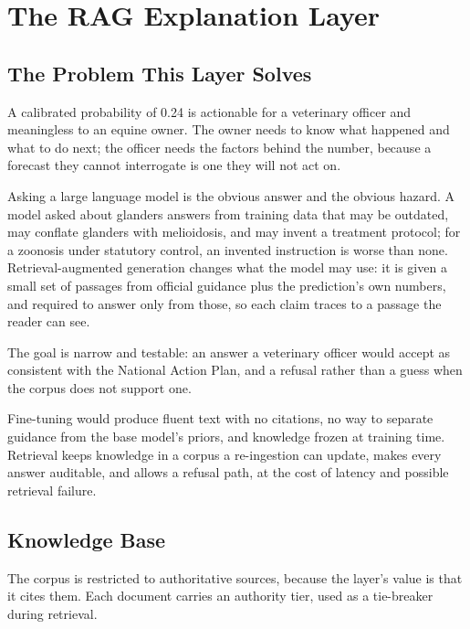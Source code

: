 \documentclass[10pt,openany]{report}
\begin{document}
\chapter{The RAG Explanation Layer}
\label{ch:rag}

\section{The Problem This Layer Solves}

A calibrated probability of 0.24 is actionable for a veterinary officer and meaningless to an equine
owner. The owner needs to know what happened and what to do next; the officer needs the factors behind
the number, because a forecast they cannot interrogate is one they will not act on.

Asking a large language model is the obvious answer and the obvious hazard. A model asked about
glanders answers from training data that may be outdated, may conflate glanders with melioidosis, and
may invent a treatment protocol; for a zoonosis under statutory control, an invented instruction is
worse than none. Retrieval-augmented generation \cite{lewis2020} changes what the model may use: it is
given a small set of passages from official guidance plus the prediction's own numbers, and required
to answer only from those, so each claim traces to a passage the reader can see.

The goal is narrow and testable: an answer a veterinary officer would accept as consistent with the
National Action Plan, and a refusal rather than a guess when the corpus does not support one.

Fine-tuning would produce fluent text with no citations, no way to separate guidance from the base
model's priors, and knowledge frozen at training time. Retrieval keeps knowledge in a corpus a
re-ingestion can update, makes every answer auditable, and allows a refusal path, at the cost of
latency and possible retrieval failure.

\section{Knowledge Base}

The corpus is restricted to authoritative sources, because the layer's value is that it cites them.
Each document carries an authority tier, used as a tie-breaker during retrieval.
\end{document}
